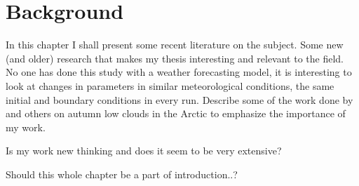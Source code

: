 \chapter{Background}
\label{chap:background}
In this chapter I shall present some recent literature on the subject. Some new (and older) research that makes my thesis interesting and relevant to the field. No one has done this study with a weather forecasting model, it is interesting to look at changes in parameters in similar meteorological conditions, the same initial and boundary conditions in every run.
Describe some of the work done by \citet{Palm2010, Wu2012} and others on autumn low clouds in the Arctic to emphasize the importance of my work.

Is my work new thinking and does it seem to be very extensive?

Should this whole chapter be a part of introduction..?